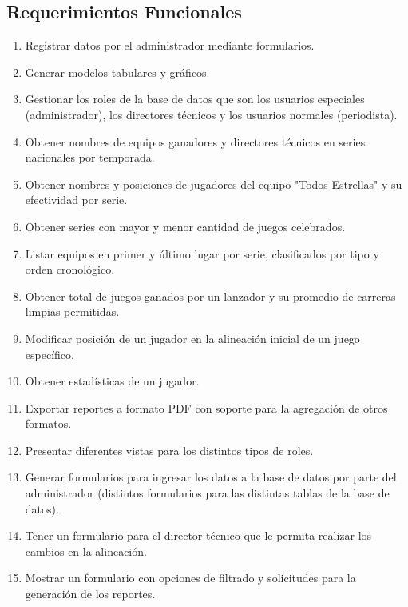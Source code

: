 \documentclass{report}
\begin{document}
        \subsection*{Requerimientos Funcionales}
            \begin{enumerate}
                \item Registrar datos por el administrador mediante formularios.
                \item Generar modelos tabulares y gráficos.
                \item Gestionar los roles de la base de datos que son los usuarios especiales (administrador), los 
                directores técnicos y los usuarios normales (periodista).
                \item Obtener nombres de equipos ganadores y directores técnicos en series nacionales por temporada.
                \item Obtener nombres y posiciones de jugadores del equipo "Todos Estrellas" y su efectividad por 
                serie.
                \item Obtener series con mayor y menor cantidad de juegos celebrados.
                \item Listar equipos en primer y último lugar por serie, clasificados por tipo y orden cronológico.
                \item Obtener total de juegos ganados por un lanzador y su promedio de carreras limpias permitidas.
                \item Modificar posición de un jugador en la alineación inicial de un juego específico.
                \item Obtener estadísticas de un jugador.
                \item Exportar reportes a formato PDF con soporte para la agregación de otros formatos.
                \item Presentar diferentes vistas para los distintos tipos de roles.
                \item Generar formularios para ingresar los datos a la base de datos por parte del administrador 
                (distintos formularios para las distintas tablas de la base de datos).
                \item Tener un formulario para el director técnico que le permita realizar los cambios en  la 
                alineación.
                \item Mostrar un formulario con opciones de filtrado y solicitudes para la generación de los reportes.
            \end{enumerate}
\end{document}
